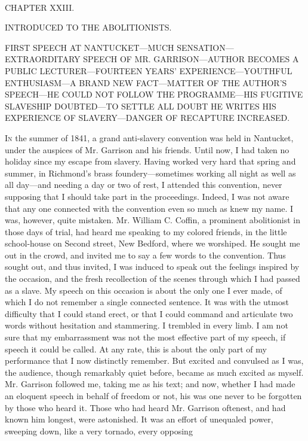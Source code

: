{}

~

{CHAPTER XXIII.}

INTRODUCED TO THE ABOLITIONISTS.

{FIRST SPEECH AT NANTUCKET---MUCH SENSATION---{EXTRAORDITARY} SPEECH OF
MR. GARRISON---AUTHOR BECOMES A PUBLIC LECTURER---FOURTEEN YEARS'
EXPERIENCE---YOUTHFUL ENTHUSIASM---A BRAND NEW FACT---MATTER OF THE
AUTHOR'S SPEECH---HE COULD NOT FOLLOW THE PROGRAMME---HIS FUGITIVE
SLAVESHIP DOUBTED---TO SETTLE ALL DOUBT HE WRITES HIS EXPERIENCE OF
SLAVERY---DANGER OF RECAPTURE INCREASED.}

\textsc{In} the summer of 1841, a grand anti-slavery convention was held
in Nantucket, under the auspices of Mr. Garrison and his friends. Until
now, I had taken no holiday since my escape from slavery. Having worked
very hard that spring and summer, in Richmond's brass
foundery---sometimes working all night as well as all day---and needing
a day or two of rest, I attended this convention, never supposing that I
should take part in the proceedings. Indeed, I was not aware that any
one connected with the convention even so much as knew my name. I was,
however, quite mistaken. Mr. William C. Coffin, a prominent abolitionist
in those days of trial, had heard me speaking to my colored friends, in
the little school-house on Second street, New Bedford, where we
worshiped. He sought me out in the crowd, and invited me to say a few
words to the convention. Thus sought out, and thus invited, I was
induced to speak {}out the feelings inspired by the occasion, and the
fresh recollection of the scenes through which I had passed as a slave.
My speech on this occasion is about the only one I ever made, of which I
do not remember a single connected sentence. It was with the utmost
difficulty that I could stand erect, or that I could command and
articulate two words without hesitation and stammering. I trembled in
every limb. I am not sure that my embarrassment was not the most
effective part of my speech, if speech it could be called. At any rate,
this is about the only part of my performance that I now distinctly
remember. But excited and convulsed as I was, the audience, though
remarkably quiet before, became as much excited as myself. Mr. Garrison
followed me, taking me as his text; and now, whether I had made an
eloquent speech in behalf of freedom or not, his was one never to be
forgotten by those who heard it. Those who had heard Mr. Garrison
oftenest, and had known him longest, were astonished. It was an effort
of unequaled power, sweeping down, like a very tornado, every opposing
